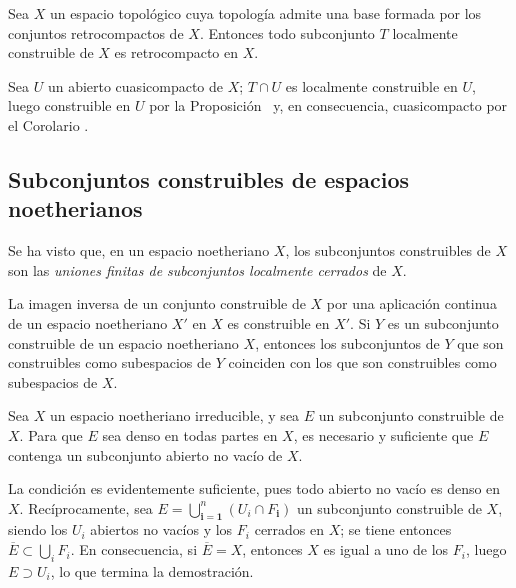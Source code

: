 \begin{corollary}[9.1.13]
\label{0.9.1.13}
\label{0.9.1.13-fr}
Sea $X$ un espacio topológico cuya topología admite una base formada por los conjuntos retrocompactos de $X$.
Entonces todo subconjunto $T$ localmente construible de $X$ es retrocompacto en $X$.
\end{corollary}


Sea $U$ un abierto cuasicompacto de $X$; $T\cap U$ es localmente construible en $U$, luego construible en $U$ por la Proposición~ y, en consecuencia, cuasicompacto por el Corolario .


\subsection{Subconjuntos construibles de espacios noetherianos}
\label{subsection:0.9.2}
\label{subsection:0.9.2-fr}

\begin{env}[9.2.1]
\label{0.9.2.1}
\label{0.9.2.1-fr}
Se ha visto  que, en un espacio noetheriano $X$, los subconjuntos construibles de $X$ son las \emph{uniones finitas de subconjuntos localmente cerrados} de $X$.

La imagen inversa de un conjunto construible de $X$ por una aplicación continua de un espacio noetheriano $X'$ en $X$ es construible en $X'$.
Si $Y$ es un subconjunto construible de un espacio noetheriano $X$, entonces los subconjuntos de $Y$ que son construibles como subespacios de $Y$ coinciden con los que son construibles como subespacios de $X$.
\end{env}

\begin{proposition}[9.2.2]
\label{0.9.2.2}
\label{0.9.2.2-fr}
Sea $X$ un espacio noetheriano irreducible, y sea $E$ un subconjunto construible de $X$.
Para que $E$ sea denso en todas partes en $X$, es necesario y suficiente que $E$ contenga un subconjunto abierto no vacío de $X$.
\end{proposition}


La condición es evidentemente suficiente, pues todo abierto no vacío es denso en $X$.
Recíprocamente, sea $E=\bigcup_{\boldsymbol{i}=\mathbf{1}}^n(U_i\cap F_{\boldsymbol{i}})$ un subconjunto construible de $X$, siendo los $U_i$ abiertos no vacíos y los $F_i$ cerrados en $X$; se tiene entonces $\overline{E}\subset\bigcup_i F_i$.
En consecuencia, si $\overline{E}=X$, entonces $X$ es igual a uno de los $F_i$, luego $E\supset U_i$, lo que termina la demostración.


